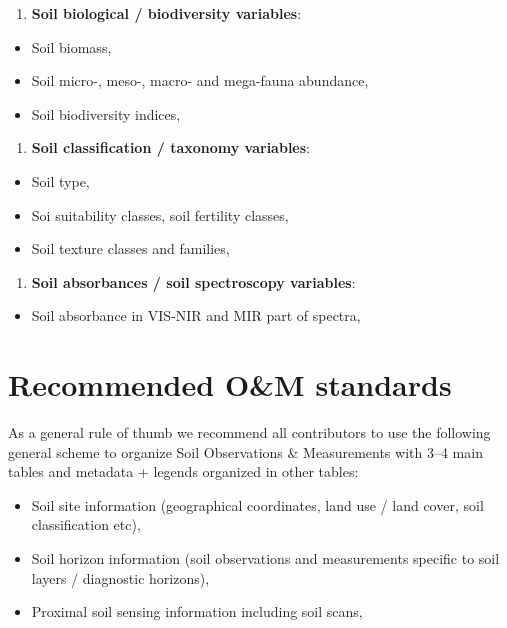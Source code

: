 \documentclass[
  graybox,natbib,nospthms]{svmono}
\providecommand{\tightlist}{%
  \setlength{\itemsep}{0pt}\setlength{\parskip}{0pt}}
\providecommand{\tightlist}{\setlength{\itemsep}{0pt}\setlength{\parskip}{0pt}}
\begin{document}
\begin{enumerate}
\def\labelenumi{\arabic{enumi}.}
\setcounter{enumi}{2}
\tightlist
\item
  \textbf{Soil biological / biodiversity variables}:
\end{enumerate}

\begin{itemize}
\tightlist
\item
  Soil biomass,
\item
  Soil micro-, meso-, macro- and mega-fauna abundance,
\item
  Soil biodiversity indices,
\end{itemize}

\begin{enumerate}
\def\labelenumi{\arabic{enumi}.}
\setcounter{enumi}{3}
\tightlist
\item
  \textbf{Soil classification / taxonomy variables}:
\end{enumerate}

\begin{itemize}
\tightlist
\item
  Soil type,
\item
  Soi suitability classes, soil fertility classes,
\item
  Soil texture classes and families,
\end{itemize}

\begin{enumerate}
\def\labelenumi{\arabic{enumi}.}
\setcounter{enumi}{4}
\tightlist
\item
  \textbf{Soil absorbances / soil spectroscopy variables}:
\end{enumerate}

\begin{itemize}
\tightlist
\item
  Soil absorbance in VIS-NIR and MIR part of spectra,
\end{itemize}

\hypertarget{recommended-om-standards}{%
\section{Recommended O\&M standards}\label{recommended-om-standards}}

As a general rule of thumb we recommend all contributors to use the following
general scheme to organize Soil Observations \& Measurements with 3--4 main tables
and metadata + legends organized in other tables:

\begin{itemize}
\tightlist
\item
  Soil site information (geographical coordinates, land use / land cover, soil classification etc),
\item
  Soil horizon information (soil observations and measurements specific to soil layers / diagnostic horizons),
\item
  Proximal soil sensing information including soil scans,
\end{itemize}
\end{document}
